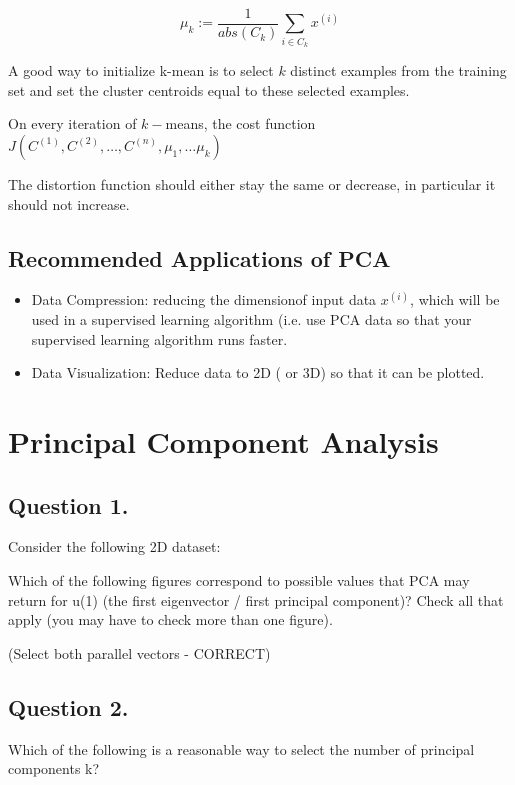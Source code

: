 \[ 
\mu_k := \frac{1}{abs(C_k)} \sum_{i \in C_k} x^{(i)}
\]

A good way to initialize k-mean is to select $k$ distinct examples from the training set and set the cluster centroids equal to these selected examples.

On every iteration of $k-$means, the cost function $J(C^{(1)},C^{(2)},\ldots, C^{(n)},
\mu_1,\ldots \mu_k)$

The distortion function should either stay the same or decrease, in particular it should not increase.

\subsection{Recommended Applications of PCA}

\begin{itemize}
\item Data Compression: reducing the dimensionof input data $x^{(i)}$, which will be used in a supervised learning algorithm
(i.e. use PCA data so that your supervised learning algorithm runs faster.

\item Data Visualization: Reduce data to 2D ( or 3D) so that it can be plotted.
\end{itemize}

\section{Principal Component Analysis}


\subsection{ Question 1. }

Consider the following 2D dataset:


Which of the following figures correspond to possible values that PCA may return for u(1) (the first eigenvector / first principal component)? 
Check all that apply (you may have to check more than one figure).

(Select both parallel vectors - CORRECT)








\subsection{ Question 2. }
Which of the following is a reasonable way to select the number of principal components k?


